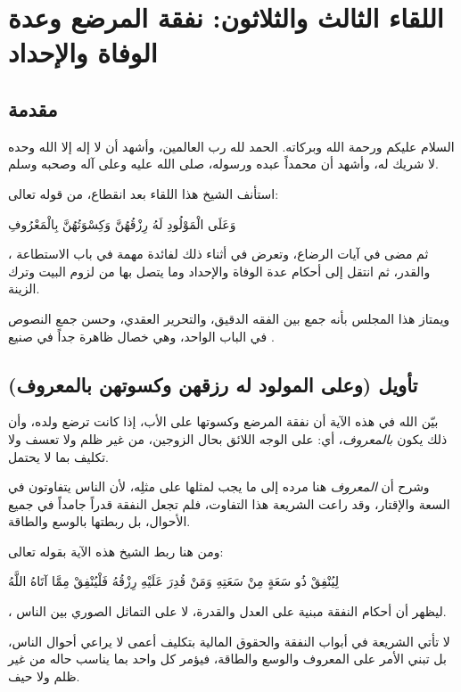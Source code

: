 \chapter{اللقاء الثالث والثلاثون: نفقة المرضع وعدة الوفاة والإحداد}

\section{مقدمة}
السلام عليكم ورحمة الله وبركاته. الحمد لله رب العالمين، وأشهد أن لا إله إلا الله وحده لا شريك له، وأشهد أن محمداً عبده ورسوله، صلى الله عليه وعلى آله وصحبه وسلم.

استأنف الشيخ هذا اللقاء بعد انقطاع، من قوله تعالى: \begin{ayah}وَعَلَى الْمَوْلُودِ لَهُ رِزْقُهُنَّ وَكِسْوَتُهُنَّ بِالْمَعْرُوفِ\end{ayah}، ثم مضى في آيات الرضاع، وتعرض في أثناء ذلك لفائدة مهمة في باب الاستطاعة والقدر، ثم انتقل إلى أحكام عدة الوفاة والإحداد وما يتصل بها من لزوم البيت وترك الزينة.

ويمتاز هذا المجلس بأنه جمع بين الفقه الدقيق، والتحرير العقدي، وحسن جمع النصوص في الباب الواحد، وهي خصال ظاهرة جداً في صنيع .

\separator

\section{تأويل (وعلى المولود له رزقهن وكسوتهن بالمعروف)}
 بيّن الله في هذه الآية أن نفقة المرضع وكسوتها على الأب، إذا كانت ترضع ولده، وأن ذلك يكون \textit{بالمعروف}، أي: على الوجه اللائق بحال الزوجين، من غير ظلم ولا تعسف ولا تكليف بما لا يحتمل.

وشرح  أن \textit{المعروف} هنا مرده إلى ما يجب لمثلها على مثلِه، لأن الناس يتفاوتون في السعة والإقتار، وقد راعت الشريعة هذا التفاوت، فلم تجعل النفقة قدراً جامداً في جميع الأحوال، بل ربطتها بالوسع والطاقة.

ومن هنا ربط الشيخ هذه الآية بقوله تعالى: \begin{ayah}لِيُنْفِقْ ذُو سَعَةٍ مِنْ سَعَتِهِ وَمَنْ قُدِرَ عَلَيْهِ رِزْقُهُ فَلْيُنْفِقْ مِمَّا آتَاهُ اللَّهُ\end{ayah}، ليظهر أن أحكام النفقة مبنية على العدل والقدرة، لا على التماثل الصوري بين الناس.

\begin{fawaid}
لا تأتي الشريعة في أبواب النفقة والحقوق المالية بتكليف أعمى لا يراعي أحوال الناس، بل تبني الأمر على المعروف والوسع والطاقة، فيؤمر كل واحد بما يناسب حاله من غير ظلم ولا حيف.
\end{fawaid}

